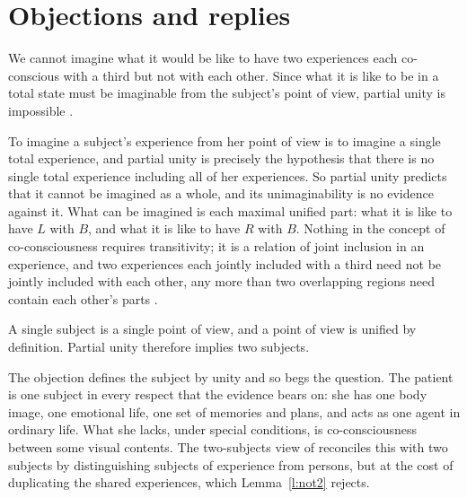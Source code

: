 \documentclass{situationist-preprint}
\begin{document}
\section{Objections and replies}

\begin{objection}[Inconceivability]\label{o:inconc}
We cannot imagine what it would be like to have two experiences each co-conscious with a third but not with each other. Since what it is like to be in a total state must be imaginable from the subject's point of view, partial unity is impossible \citep{Hurley1998,Bayne2008}.
\end{objection}

\begin{reply}
To imagine a subject's experience from her point of view is to imagine a single total experience, and partial unity is precisely the hypothesis that there is no single total experience including all of her experiences. So partial unity predicts that it cannot be imagined as a whole, and its unimaginability is no evidence against it. What can be imagined is each maximal unified part: what it is like to have $L$ with $B$, and what it is like to have $R$ with $B$. Nothing in the concept of co-consciousness requires transitivity; it is a relation of joint inclusion in an experience, and two experiences each jointly included with a third need not be jointly included with each other, any more than two overlapping regions need contain each other's parts \citep{Lockwood1989}.
\end{reply}

\begin{objection}[Subject]\label{o:subject}
A single subject is a single point of view, and a point of view is unified by definition. Partial unity therefore implies two subjects.
\end{objection}

\begin{reply}
The objection defines the subject by unity and so begs the question. The patient is one subject in every respect that the evidence bears on: she has one body image, one emotional life, one set of memories and plans, and acts as one agent in ordinary life. What she lacks, under special conditions, is co-consciousness between some visual contents. The two-subjects view of \citet{Schechter2018} reconciles this with two subjects by distinguishing subjects of experience from persons, but at the cost of duplicating the shared experiences, which Lemma~\ref{l:not2} rejects.
\end{reply}
\end{document}
